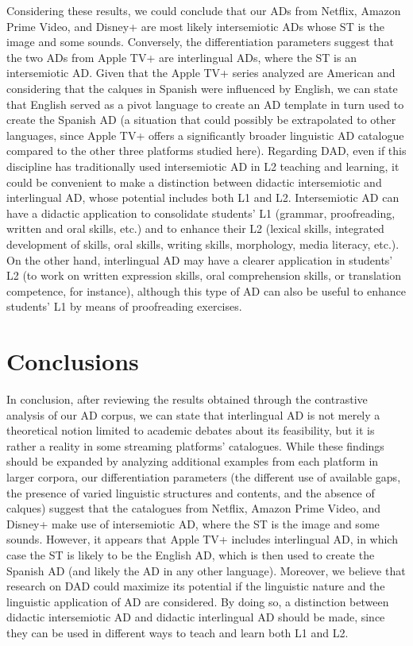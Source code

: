 \documentclass[english]{textolivre}
\begin{document}
Considering these results, we could conclude that our ADs from Netflix, Amazon Prime Video, and Disney+ are most likely intersemiotic ADs whose ST is the image and some sounds. Conversely, the differentiation parameters suggest that the two ADs from Apple TV+ are interlingual ADs, where the ST is an intersemiotic AD. Given that the Apple TV+ series analyzed are American and considering that the calques in Spanish were influenced by English, we can state that English served as a pivot language to create an AD template in turn used to create the Spanish AD (a situation that could possibly be extrapolated to other languages, since Apple TV+ offers a significantly broader linguistic AD catalogue compared to the other three platforms studied here). Regarding DAD, even if this discipline has traditionally used intersemiotic AD in L2 teaching and learning, it could be convenient to make a distinction between didactic intersemiotic and interlingual AD, whose potential includes both L1 and L2. Intersemiotic AD can have a didactic application to consolidate students’ L1 (grammar, proofreading, written and oral skills, etc.) and to enhance their L2 (lexical skills, integrated development of skills, oral skills, writing skills, morphology, media literacy, etc.). On the other hand, interlingual AD may have a clearer application in students’ L2 (to work on written expression skills, oral comprehension skills, or translation competence, for instance), although this type of AD can also be useful to enhance students’ L1 by means of proofreading exercises. 

\section{Conclusions}\label{sec-idioma}
In conclusion, after reviewing the results obtained through the contrastive analysis of our AD corpus, we can state that interlingual AD is not merely a theoretical notion limited to academic debates about its feasibility, but it is rather a reality in some streaming platforms’ catalogues. While these findings should be expanded by analyzing additional examples from each platform in larger corpora, our differentiation parameters (the different use of available gaps, the presence of varied linguistic structures and contents, and the absence of calques) suggest that the catalogues from Netflix, Amazon Prime Video, and Disney+ make use of intersemiotic AD, where the ST is the image and some sounds. However, it appears that Apple TV+ includes interlingual AD, in which case the ST is likely to be the English AD, which is then used to create the Spanish AD (and likely the AD in any other language). Moreover, we believe that research on DAD could maximize its potential if the linguistic nature and the linguistic application of AD are considered. By doing so, a distinction between didactic intersemiotic AD and didactic interlingual AD should be made, since they can be used in different ways to teach and learn both L1 and L2.
\end{document}
